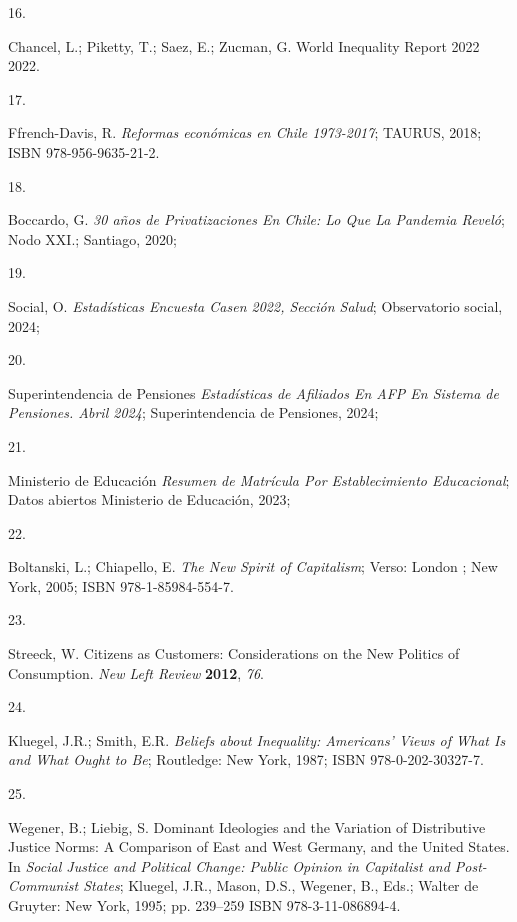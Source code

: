 \documentclass[
  12pt,
  letterpaper,
]{article}
\newlength{\cslhangindent}
\newlength{\csllabelwidth}
\newenvironment{CSLReferences}[2] %
 {\begin{list}{}{%
  \setlength{\itemindent}{0pt}
  \setlength{\leftmargin}{0pt}
  \setlength{\parsep}{0pt}
  \ifodd #1
   \setlength{\leftmargin}{\cslhangindent}
   \setlength{\itemindent}{-1\cslhangindent}
  \fi
  \setlength{\itemsep}{#2\baselineskip}}}
 {\end{list}}
\newcommand{\CSLLeftMargin}[1]{\parbox[t]{\csllabelwidth}{\strut#1\strut}}
\newcommand{\CSLRightInline}[1]{\parbox[t]{\linewidth - \csllabelwidth}{\strut#1\strut}}
\begin{document}
\begin{CSLReferences}{0}{0}
\CSLLeftMargin{16. }%
\CSLRightInline{Chancel, L.; Piketty, T.; Saez, E.; Zucman, G. World
Inequality Report 2022 2022.}

\CSLLeftMargin{17. }%
\CSLRightInline{Ffrench-Davis, R. \emph{{Reformas econ{ó}micas en Chile
1973-2017}}; TAURUS, 2018; ISBN 978-956-9635-21-2.}

\CSLLeftMargin{18. }%
\CSLRightInline{Boccardo, G. \emph{30 a{ñ}os de Privatizaciones En
{Chile}: Lo Que La Pandemia Revel{ó}}; Nodo XXI.; Santiago, 2020;}

\CSLLeftMargin{19. }%
\CSLRightInline{Social, O. \emph{Estad{í}sticas {Encuesta Casen} 2022,
Secci{ó}n {Salud}}; Observatorio social, 2024;}

\CSLLeftMargin{20. }%
\CSLRightInline{Superintendencia de Pensiones \emph{Estad{í}sticas de
{Afiliados} En {AFP} En {Sistema} de {Pensiones}. {Abril} 2024};
Superintendencia de Pensiones, 2024;}

\CSLLeftMargin{21. }%
\CSLRightInline{Ministerio de Educación \emph{Resumen de Matr{í}cula Por
Establecimiento Educacional}; Datos abiertos Ministerio de Educaci{ó}n,
2023;}

\CSLLeftMargin{22. }%
\CSLRightInline{Boltanski, L.; Chiapello, E. \emph{The New Spirit of
Capitalism}; Verso: London ; New York, 2005; ISBN 978-1-85984-554-7.}

\CSLLeftMargin{23. }%
\CSLRightInline{Streeck, W. Citizens as {Customers}: {Considerations} on
the {New Politics} of {Consumption}. \emph{New Left Review}
\textbf{2012}, \emph{76}.}

\CSLLeftMargin{24. }%
\CSLRightInline{Kluegel, J.R.; Smith, E.R. \emph{Beliefs about
{Inequality}: {Americans}' {Views} of {What} Is and {What Ought} to Be};
Routledge: New York, 1987; ISBN 978-0-202-30327-7.}

\CSLLeftMargin{25. }%
\CSLRightInline{Wegener, B.; Liebig, S. Dominant {Ideologies} and the
{Variation} of {Distributive Justice Norms}: {A Comparison} of {East}
and {West Germany}, and the {United States}. In \emph{Social {Justice}
and {Political Change}: {Public Opinion} in {Capitalist} and
{Post-Communist States}}; Kluegel, J.R., Mason, D.S., Wegener, B., Eds.;
Walter de Gruyter: New York, 1995; pp. 239--259 ISBN 978-3-11-086894-4.}


\end{CSLReferences}
\end{document}
